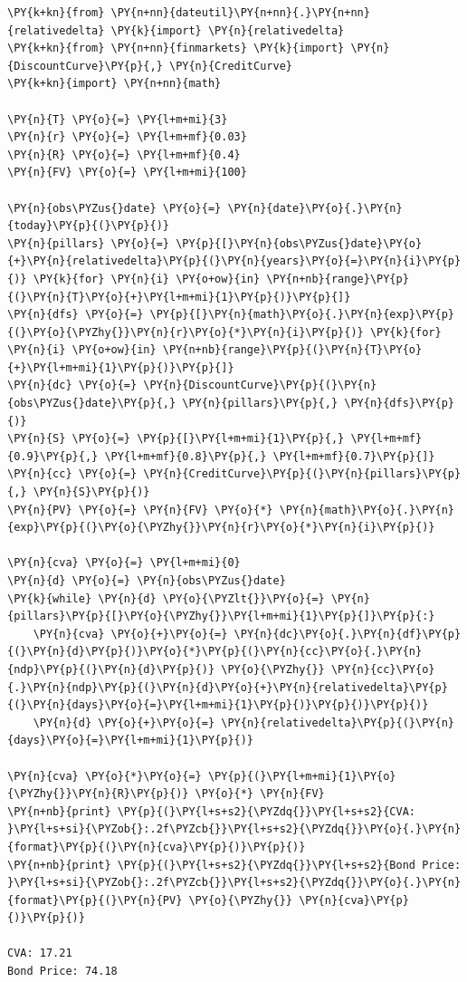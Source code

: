\begin{tcolorbox}[breakable, size=fbox, boxrule=1pt, pad at break*=1mm,colback=cellbackground, colframe=cellborder]
\begin{Verbatim}[commandchars=\\\{\}]
\PY{k+kn}{from} \PY{n+nn}{dateutil}\PY{n+nn}{.}\PY{n+nn}{relativedelta} \PY{k}{import} \PY{n}{relativedelta}
\PY{k+kn}{from} \PY{n+nn}{finmarkets} \PY{k}{import} \PY{n}{DiscountCurve}\PY{p}{,} \PY{n}{CreditCurve}
\PY{k+kn}{import} \PY{n+nn}{math}
		
\PY{n}{T} \PY{o}{=} \PY{l+m+mi}{3} 
\PY{n}{r} \PY{o}{=} \PY{l+m+mf}{0.03}
\PY{n}{R} \PY{o}{=} \PY{l+m+mf}{0.4}
\PY{n}{FV} \PY{o}{=} \PY{l+m+mi}{100}
		
\PY{n}{obs\PYZus{}date} \PY{o}{=} \PY{n}{date}\PY{o}{.}\PY{n}{today}\PY{p}{(}\PY{p}{)}
\PY{n}{pillars} \PY{o}{=} \PY{p}{[}\PY{n}{obs\PYZus{}date}\PY{o}{+}\PY{n}{relativedelta}\PY{p}{(}\PY{n}{years}\PY{o}{=}\PY{n}{i}\PY{p}{)} \PY{k}{for} \PY{n}{i} \PY{o+ow}{in} \PY{n+nb}{range}\PY{p}{(}\PY{n}{T}\PY{o}{+}\PY{l+m+mi}{1}\PY{p}{)}\PY{p}{]}
\PY{n}{dfs} \PY{o}{=} \PY{p}{[}\PY{n}{math}\PY{o}{.}\PY{n}{exp}\PY{p}{(}\PY{o}{\PYZhy{}}\PY{n}{r}\PY{o}{*}\PY{n}{i}\PY{p}{)} \PY{k}{for} \PY{n}{i} \PY{o+ow}{in} \PY{n+nb}{range}\PY{p}{(}\PY{n}{T}\PY{o}{+}\PY{l+m+mi}{1}\PY{p}{)}\PY{p}{]}
\PY{n}{dc} \PY{o}{=} \PY{n}{DiscountCurve}\PY{p}{(}\PY{n}{obs\PYZus{}date}\PY{p}{,} \PY{n}{pillars}\PY{p}{,} \PY{n}{dfs}\PY{p}{)}
\PY{n}{S} \PY{o}{=} \PY{p}{[}\PY{l+m+mi}{1}\PY{p}{,} \PY{l+m+mf}{0.9}\PY{p}{,} \PY{l+m+mf}{0.8}\PY{p}{,} \PY{l+m+mf}{0.7}\PY{p}{]}
\PY{n}{cc} \PY{o}{=} \PY{n}{CreditCurve}\PY{p}{(}\PY{n}{pillars}\PY{p}{,} \PY{n}{S}\PY{p}{)}
\PY{n}{PV} \PY{o}{=} \PY{n}{FV} \PY{o}{*} \PY{n}{math}\PY{o}{.}\PY{n}{exp}\PY{p}{(}\PY{o}{\PYZhy{}}\PY{n}{r}\PY{o}{*}\PY{n}{i}\PY{p}{)}
		
\PY{n}{cva} \PY{o}{=} \PY{l+m+mi}{0}
\PY{n}{d} \PY{o}{=} \PY{n}{obs\PYZus{}date}
\PY{k}{while} \PY{n}{d} \PY{o}{\PYZlt{}}\PY{o}{=} \PY{n}{pillars}\PY{p}{[}\PY{o}{\PYZhy{}}\PY{l+m+mi}{1}\PY{p}{]}\PY{p}{:}
    \PY{n}{cva} \PY{o}{+}\PY{o}{=} \PY{n}{dc}\PY{o}{.}\PY{n}{df}\PY{p}{(}\PY{n}{d}\PY{p}{)}\PY{o}{*}\PY{p}{(}\PY{n}{cc}\PY{o}{.}\PY{n}{ndp}\PY{p}{(}\PY{n}{d}\PY{p}{)} \PY{o}{\PYZhy{}} \PY{n}{cc}\PY{o}{.}\PY{n}{ndp}\PY{p}{(}\PY{n}{d}\PY{o}{+}\PY{n}{relativedelta}\PY{p}{(}\PY{n}{days}\PY{o}{=}\PY{l+m+mi}{1}\PY{p}{)}\PY{p}{)}\PY{p}{)}
    \PY{n}{d} \PY{o}{+}\PY{o}{=} \PY{n}{relativedelta}\PY{p}{(}\PY{n}{days}\PY{o}{=}\PY{l+m+mi}{1}\PY{p}{)}
		
\PY{n}{cva} \PY{o}{*}\PY{o}{=} \PY{p}{(}\PY{l+m+mi}{1}\PY{o}{\PYZhy{}}\PY{n}{R}\PY{p}{)} \PY{o}{*} \PY{n}{FV}
\PY{n+nb}{print} \PY{p}{(}\PY{l+s+s2}{\PYZdq{}}\PY{l+s+s2}{CVA: }\PY{l+s+si}{\PYZob{}:.2f\PYZcb{}}\PY{l+s+s2}{\PYZdq{}}\PY{o}{.}\PY{n}{format}\PY{p}{(}\PY{n}{cva}\PY{p}{)}\PY{p}{)}
\PY{n+nb}{print} \PY{p}{(}\PY{l+s+s2}{\PYZdq{}}\PY{l+s+s2}{Bond Price: }\PY{l+s+si}{\PYZob{}:.2f\PYZcb{}}\PY{l+s+s2}{\PYZdq{}}\PY{o}{.}\PY{n}{format}\PY{p}{(}\PY{n}{PV} \PY{o}{\PYZhy{}} \PY{n}{cva}\PY{p}{)}\PY{p}{)}

CVA: 17.21
Bond Price: 74.18
\end{Verbatim}
\end{tcolorbox}